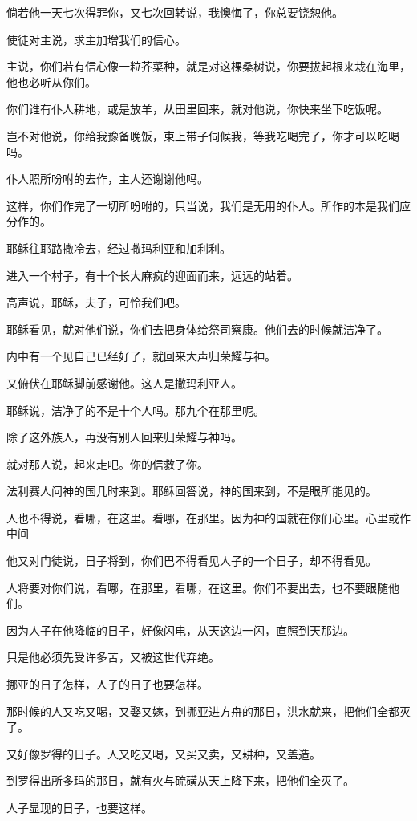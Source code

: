 \documentclass[12pt,oneside]{book}
\begin{document}
倘若他一天七次得罪你，又七次回转说，我懊悔了，你总要饶恕他。

使徒对主说，求主加增我们的信心。

主说，你们若有信心像一粒芥菜种，就是对这棵桑树说，你要拔起根来栽在海里，他也必听从你们。

你们谁有仆人耕地，或是放羊，从田里回来，就对他说，你快来坐下吃饭呢。

岂不对他说，你给我豫备晚饭，束上带子伺候我，等我吃喝完了，你才可以吃喝吗。

仆人照所吩咐的去作，主人还谢谢他吗。

这样，你们作完了一切所吩咐的，只当说，我们是无用的仆人。所作的本是我们应分作的。

耶稣往耶路撒冷去，经过撒玛利亚和加利利。

进入一个村子，有十个长大麻疯的迎面而来，远远的站着。

高声说，耶稣，夫子，可怜我们吧。

耶稣看见，就对他们说，你们去把身体给祭司察康。他们去的时候就洁净了。

内中有一个见自己已经好了，就回来大声归荣耀与神。

又俯伏在耶稣脚前感谢他。这人是撒玛利亚人。

耶稣说，洁净了的不是十个人吗。那九个在那里呢。

除了这外族人，再没有别人回来归荣耀与神吗。

就对那人说，起来走吧。你的信救了你。

法利赛人问神的国几时来到。耶稣回答说，神的国来到，不是眼所能见的。

人也不得说，看哪，在这里。看哪，在那里。因为神的国就在你们心里。心里或作中间

他又对门徒说，日子将到，你们巴不得看见人子的一个日子，却不得看见。

人将要对你们说，看哪，在那里，看哪，在这里。你们不要出去，也不要跟随他们。

因为人子在他降临的日子，好像闪电，从天这边一闪，直照到天那边。

只是他必须先受许多苦，又被这世代弃绝。

挪亚的日子怎样，人子的日子也要怎样。

那时候的人又吃又喝，又娶又嫁，到挪亚进方舟的那日，洪水就来，把他们全都灭了。

又好像罗得的日子。人又吃又喝，又买又卖，又耕种，又盖造。

到罗得出所多玛的那日，就有火与硫磺从天上降下来，把他们全灭了。

人子显现的日子，也要这样。
\end{document}
